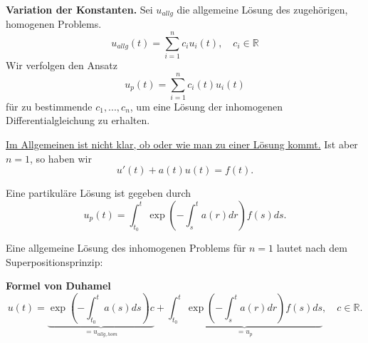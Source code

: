 \documentclass[a4paper]{book}
\theoremstyle{plain}
\theoremstyle{definition}
\newcommand{\R}{\mathbb R}
\newcommand{\vbreak}{\vspace{8mm}}
\begin{document}
\textbf{Variation der Konstanten.} Sei $u_{allg}$ die allgemeine Lösung des zugehörigen, homogenen Problems. $$u_{allg} (t) = \sum^n_{i=1} c_iu_i(t), \quad c_i \in \R$$ Wir verfolgen den Ansatz $$u_p(t) = \sum^n_{i=1}c_i(t)u_i(t)$$ für zu bestimmende $c_1,...,c_n$, um eine Lösung der inhomogenen Differentialgleichung zu erhalten.

\vbreak 

\underline{Im Allgemeinen ist nicht klar, ob oder wie man zu einer Lösung kommt.} Ist aber $n=1$, so haben wir
\[
	u'(t) + a(t)u(t) = f(t).
\]

Eine partikuläre Lösung ist gegeben durch
\[
	u_p(t) = \int^t_{t_0} \exp{\left(- \int^t_s a(r)dr\right)} f(s) ds.
\]

Eine allgemeine Lösung des inhomogenen Problems für $n=1$ lautet nach dem Superpositionsprinzip:
\vbreak

\begin{framed}\textbf{Formel von Duhamel}
\[
	u(t) = \underbrace{\exp{\left(-\int^t_{t_0}a(s)ds\right)}c}_{=u_{allg, hom}} + \underbrace{\int^t_{t_0} \exp{\left(- \int^t_s a(r)dr\right)} f(s) ds}_{=u_p}, \quad c \in \R.
\]
\end{framed}
\end{document}
